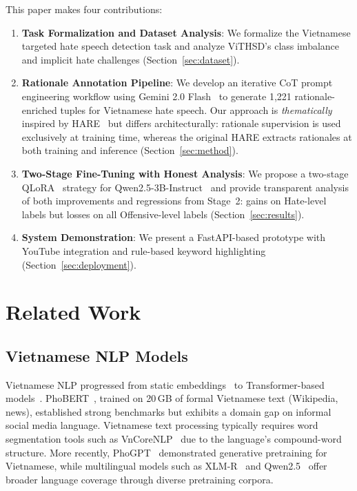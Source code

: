 \documentclass[conference]{IEEEtran}
\begin{document}
This paper makes four contributions:
\begin{enumerate}[leftmargin=*, label=\textbf{C\arabic*.}]
\item \textbf{Task Formalization and Dataset Analysis}: We formalize the
Vietnamese targeted hate speech detection task and analyze ViTHSD's class
imbalance and implicit hate challenges (Section~\ref{sec:dataset}).
\item \textbf{Rationale Annotation Pipeline}: We develop an iterative CoT
prompt engineering workflow using Gemini 2.0 Flash~\cite{google2025gemini2flash}
to generate 1,221 rationale-enriched tuples for Vietnamese hate speech. Our
approach is \textit{thematically} inspired by HARE~\cite{Yang2023HARE} but
differs architecturally: rationale supervision is used exclusively at training
time, whereas the original HARE extracts rationales at both training and
inference (Section~\ref{sec:method}).
\item \textbf{Two-Stage Fine-Tuning with Honest Analysis}: We propose a
two-stage QLoRA~\cite{Dettmers2023QLoRA} strategy for
Qwen2.5-3B-Instruct~\cite{Yang2025Qwen25} and provide transparent analysis of
both improvements and regressions from Stage~2: gains on Hate-level labels but
losses on all Offensive-level labels (Section~\ref{sec:results}).
\item \textbf{System Demonstration}: We present a FastAPI-based prototype with
YouTube integration and rule-based keyword highlighting
(Section~\ref{sec:deployment}).
\end{enumerate}


\section{Related Work}\label{sec:related}

\subsection{Vietnamese NLP Models}

Vietnamese NLP progressed from static embeddings~\cite{Mikolov2013Efficient,
Bojanowski2017Enriching} to Transformer-based models~\cite{Vaswani2017Attention,
Devlin2019BERT}. PhoBERT~\cite{nguyen2020phobert}, trained on 20\,GB of formal
Vietnamese text (Wikipedia, news), established strong benchmarks but exhibits a
domain gap on informal social media language. Vietnamese text processing
typically requires word segmentation tools such as
VnCoreNLP~\cite{Vu2018VnCoreNLP} due to the language's compound-word structure.
More recently, PhoGPT~\cite{Nguyen2023PhoGPT} demonstrated generative
pretraining for Vietnamese, while multilingual models such as
XLM-R~\cite{Conneau2020XLMR} and Qwen2.5~\cite{Yang2025Qwen25} offer broader
language coverage through diverse pretraining corpora.
\end{document}
